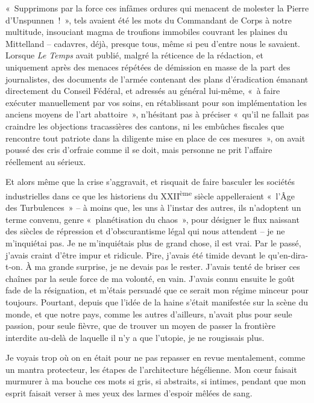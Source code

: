 \documentclass[
  extrafontsizes,
  oneside,
  14pt
]{memoir}
\begin{document}
«~Supprimons par la force ces infâmes ordures qui menacent de molester la
Pierre d'Unspunnen~!~», tels avaient été les mots du Commandant de Corps à
notre multitude, insouciant magma de troufions immobiles couvrant les plaines
du Mittelland -- cadavres, déjà, presque tous, même si peu d'entre nous le
savaient. Lorsque \emph{Le Temps} avait publié, malgré la réticence de la
rédaction, et uniquement après des menaces répétées de démission en masse de la
part des journalistes, des documents de l'armée contenant des plans
d'éradication émanant directement du Conseil Fédéral, et adressés au général
lui-même, «~à faire exécuter manuellement par vos soins, en rétablissant pour
son implémentation les anciens moyens de l'art abattoire~», n'hésitant pas à
préciser «~qu'il ne fallait pas craindre les objections tracassières des
cantons, ni les embûches fiscales que rencontre tout patriote dans la diligente
mise en place de ces mesures~», on avait poussé des cris d'orfraie comme il se
doit, mais personne ne prit l'affaire réellement au sérieux.

Et alors même que la crise s'aggravait, et risquait de faire basculer les
sociétés industrielles dans ce que les historiens du XXII\textsuperscript{ème}
siècle appelleraient «~l'Âge des Turbulences~» -- à moins que, les uns à
l'instar des autres, ils n'adoptent un terme convenu, genre «~planétisation du
chaos~», pour désigner le flux naissant des siècles de répression et
d'obscurantisme légal qui nous attendent -- je ne m'inquiétai pas. Je ne
m'inquiétais plus de grand chose, il est vrai. Par le passé, j'avais craint
d'être impur et ridicule. Pire, j'avais été timide devant le qu'en-dira-t-on. À
ma grande surprise, je ne devais pas le rester. J'avais tenté de briser ces
chaînes par la seule force de ma volonté, en vain. J'avais connu ensuite le
goût fade de la résignation, et m'étais persuadé que ce serait mon régime
minceur pour toujours. Pourtant, depuis que l'idée de la haine s'était
manifestée sur la scène du monde, et que notre pays, comme les autres
d'ailleurs, n'avait plus pour seule passion, pour seule fièvre, que de trouver
un moyen de passer la frontière interdite au-delà de laquelle il n'y a que
l'utopie, je ne rougissais plus.

Je voyais trop où on en était pour ne pas repasser en revue mentalement, comme
un mantra protecteur, les étapes de l'architecture hégélienne. Mon cœur faisait
murmurer à ma bouche ces mots si gris, si abstraits, si intimes, pendant que
mon esprit faisait verser à mes yeux des larmes d'espoir mêlées de sang.
\end{document}

